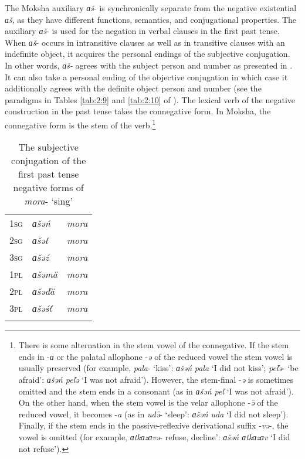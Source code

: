 \documentclass[output=paper,colorlinks,citecolor=brown,draft,draftmode]{langscibook}
\begin{document}
The Moksha auxiliary \textit{ɑš}- is synchronically separate from the negative existential \textit{ɑš}, as they have different functions, semantics, and conjugational properties. The auxiliary \textit{ɑš}- is used for the negation in verbal clauses in the first past tense. When \textit{ɑš}- occurs in intransitive clauses as well as in transitive clauses with an indefinite object, it acquires the personal endings of the subjective conjugation. In other words, \textit{ɑš-} agrees with the subject person and number as presented in . It can also take a personal ending of the objective conjugation in which case it additionally agrees with the definite object person and number (see the paradigms in Tables \ref{tab:2:9} and \ref{tab:2:10} of ). The lexical verb of the negative construction in the past tense takes the connegative form. In Moksha, the connegative form is the stem of the verb.\footnote{There is some alternation in the stem vowel of the connegative. If the stem ends in -\textit{ɑ} or the palatal allophone -\textit{ə} of the reduced vowel the stem vowel is usually preserved (for example, \textit{pala}- `kiss': \textit{ɑšəń} \textit{pala} `I did not kiss'; \textit{peľə}- `be afraid': \textit{ɑšəń peľə} `I was not afraid'). However, the stem-final -\textit{ə} is sometimes omitted and the stem ends in a consonant (as in \textit{ɑšəń peľ} `I was not afraid'). On the other hand, when the stem vowel is the velar allophone -\textit{ǝ̑} of the reduced vowel, it becomes -\textit{a} (as in \textit{udǝ̑}- `sleep': \textit{ɑšəń uda} `I did not sleep'). Finally, if the stem ends in the passive-reflexive derivational suffix -\textit{və}-, the vowel is omitted (for example, \textit{ɑtkɑzɑvə}- refuse, decline': \textit{ɑšəń ɑtkɑzɑv} `I did not refuse').}

\begin{table}
\caption{The subjective conjugation of the first past tense negative forms of \textit{mora}- `sing'}
\label{tab:2:6}
\begin{tabular}{lll}
\lsptoprule
\textsc{1sg} & \textit{ɑšəń}	&\textit{mora}    \\
\textsc{2sg} & \textit{ɑšəť}		&\textit{mora}\\
\textsc{3sg} & \textit{ɑšəź}		&\textit{mora}\\
\textsc{1pl} & \textit{ɑšəmä}	&\textit{mora}  \\
\textsc{2pl} & \textit{ɑšəďä}		&\textit{mora}  \\
\textsc{3pl} & \textit{ɑšəśť}	&\textit{mora}\\
\lspbottomrule
\end{tabular}
\end{table}
\end{document}
